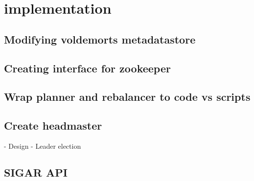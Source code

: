 
\section{implementation}

\subsection{Modifying voldemorts metadatastore}

\subsection{Creating interface for zookeeper}

\subsection{Wrap planner and rebalancer to code vs scripts}

\subsection{Create headmaster}
	- Design
	- Leader election

\subsection{SIGAR API}

